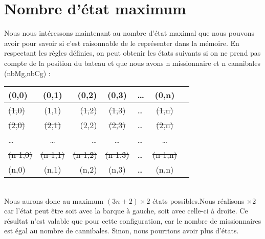 \documentclass[a4paper, 12pt, french,oneside]{book}
\begin{document}
\section{Nombre d'état maximum}
Nous nous intéressons maintenant au nombre d'état maximal que nous pouvons avoir pour savoir si c'est raisonnable de le représenter dans la mémoire. En respectant les règles définies, on peut obtenir les états suivants si on ne prend pas compte de la position du bateau et que nous avons n missionnaire et n cannibales (nbMg,nbCg) : \\
\begin{tabular}{|l|c|r|c|l|c|r|}
    \hline
    (0,0)          & (0,1) & (0,2)          & (0,3) & \dots & (0,n) \\
    \hline
    \sout{(1,0)}   &
    (1,1)          &
    \sout{(1,2)}   &
    \sout{(1,3)}   & \dots &
    \sout{(1,n)}                                                    \\
    \hline
    \sout{(2,0)}   &
    \sout{(2,1)}   &
    (2,2)          &
    \sout{(2,3)}   & \dots &
    \sout{(2,n)}                                                    \\
    \hline
    \dots          & \dots & \dots          & \dots & \dots & \dots \\
    \hline
    \sout{(n-1,0)} &
    \sout{(n-1,1)} &
    \sout{(n-1,2)} &
    \sout{(n-1,3)} & \dots & \sout{(n-1,n)}                         \\
    \hline
    (n,0)          &
    (n,1)          &
    (n,2)          &
    (n,3)          & \dots & (n,n)                                  \\
    \hline
\end{tabular} \\
Nous aurons donc au maximum $(3n+2)\times2$ états possibles.Nous réalisons $\times 2$ car l'état peut être soit avec la barque à gauche, soit avec celle-ci à droite. Ce résultat n'est valable que pour cette configuration, car le nombre de missionnaires est égal au nombre de cannibales. Sinon, nous pourrions avoir plus d'états.
\end{document}
